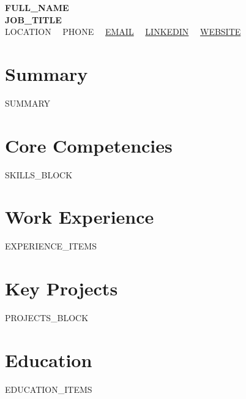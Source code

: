 \documentclass[10pt,letterpaper]{article}
\begin{document}
\begin{center}
  {\LARGE \textbf{{{FULL_NAME}}}} \\[3pt]
  \textbf{{{JOB_TITLE}}} \\[4pt]
  \small
  {{LOCATION}} \ \textbullet \ 
  {{PHONE}} \ \textbullet \ 
  \href{mailto:{{EMAIL}}}{{{EMAIL}}} \ \textbullet \ 
  \href{https://{{LINKEDIN}}}{{{LINKEDIN}}} \ \textbullet \ 
  \href{https://{{WEBSITE}}}{{{WEBSITE}}}
\end{center}

\vspace{-6pt}

\section{Summary}
{{SUMMARY}}

\section{Core Competencies}
{{SKILLS_BLOCK}}

\section{Work Experience}
{{EXPERIENCE_ITEMS}}

\section{Key Projects}
{{PROJECTS_BLOCK}}

\section{Education}
{{EDUCATION_ITEMS}}
\end{document}
